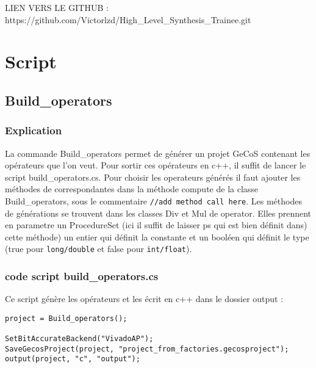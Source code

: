 \documentclass[10pt,a4paper,twoside]{article}
\begin{document}



LIEN VERS LE GITHUB : \\
https://github.com/Victorlzd/High\_Level\_Synthesis\_Trainee.git

\section{Script}
\subsection{Build\_operators}
\subsubsection{Explication} 
La commande Build\_operators permet de générer un projet GeCoS contenant les opérateurs que l'on veut. Pour sortir ces opérateurs en c++,
il suffit de lancer le script build\_operators.cs. Pour choisir les operateurs générés il faut ajouter les méthodes de correspondantes
dans la méthode compute de la classe Build\_operators, sous le commentaire \verb=//add method call here=. Les méthodes de générations se trouvent
dans les classes Div et Mul de operator. Elles prennent en parametre un ProcedureSet (ici il suffit de laisser ps qui est bien définit dans)
cette méthode) un entier qui définit la constante et un booléen qui définit le type (true pour \verb=long/double= et false pour \verb=int/float=).

\subsubsection{code script build\_operators.cs} 
Ce script génère les opérateurs et les écrit en c++ dans le dossier output :
\begin{verbatim}
project = Build_operators(); 

SetBitAccurateBackend("VivadoAP");
SaveGecosProject(project, "project_from_factories.gecosproject");
output(project, "c", "output"); 
\end{verbatim}
\end{document}
